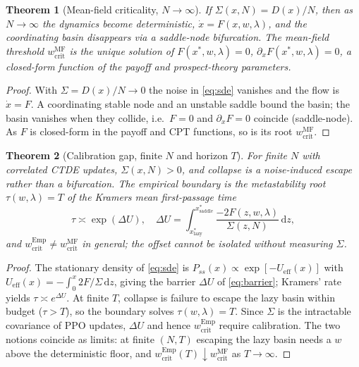 \documentclass[letterpaper]{article} %
\theoremstyle{plain}
\newtheorem{theorem}{Theorem}
\newcommand{\wcrit}{w_{\mathrm{crit}}}
\begin{document}
\begin{theorem}[Mean-field criticality, $N\to\infty$]\label{thm:mf}
If $\Sigma(x,N)=D(x)/N$, then as $N\to\infty$ the dynamics become deterministic,
$\dot x=F(x,w,\lambda)$, and the coordinating basin disappears via a saddle-node bifurcation.
The mean-field threshold $\wcrit^{\mathrm{MF}}$ is the unique solution of
$F(x^\ast,w,\lambda)=0$, $\partial_x F(x^\ast,w,\lambda)=0$, a closed-form function of the
payoff and prospect-theory parameters.
\end{theorem}
\begin{proof}
With $\Sigma=D(x)/N\to0$ the noise in \eqref{eq:sde} vanishes and the flow is $\dot x=F$. A
coordinating stable node and an unstable saddle bound the basin; the basin vanishes when they
collide, i.e.\ $F=0$ and $\partial_x F=0$ coincide (saddle-node). As $F$ is closed-form in the
payoff and CPT functions, so is its root $\wcrit^{\mathrm{MF}}$.
\end{proof}

\begin{theorem}[Calibration gap, finite $N$ and horizon $T$]\label{thm:gap}
For finite $N$ with correlated CTDE updates, $\Sigma(x,N)>0$, and collapse is a noise-induced
escape rather than a bifurcation. The empirical boundary is the metastability root
$\tau(w,\lambda)=T$ of the Kramers mean first-passage time
\begin{equation}
 \tau\asymp\exp(\Delta U),\quad
 \Delta U=\int_{x^\ast_{\mathrm{lazy}}}^{x^\ast_{\mathrm{saddle}}}\frac{-2F(z,w,\lambda)}{\Sigma(z,N)}\,\mathrm{d}z,
 \label{eq:barrier}
\end{equation}
and $\wcrit^{\mathrm{Emp}}\neq\wcrit^{\mathrm{MF}}$ in general; the offset cannot be isolated
without measuring $\Sigma$.
\end{theorem}
\begin{proof}
The stationary density of \eqref{eq:sde} is $P_{ss}(x)\propto\exp[-U_{\mathrm{eff}}(x)]$ with
$U_{\mathrm{eff}}(x)=-\int_0^x 2F/\Sigma\,\mathrm{d}z$, giving the barrier $\Delta U$ of
\eqref{eq:barrier}; Kramers' rate yields $\tau\asymp e^{\Delta U}$. At finite $T$, collapse is
failure to escape the lazy basin within budget ($\tau>T$), so the boundary solves
$\tau(w,\lambda)=T$. Since $\Sigma$ is the
intractable covariance of PPO updates, $\Delta U$ and hence $\wcrit^{\mathrm{Emp}}$ require
calibration. The two notions coincide as limits: at finite $(N,T)$ escaping the lazy basin needs a
$w$ above the deterministic floor, and $\wcrit^{\mathrm{Emp}}(T)\downarrow\wcrit^{\mathrm{MF}}$ as
$T\to\infty$.
\end{proof}
\end{document}
